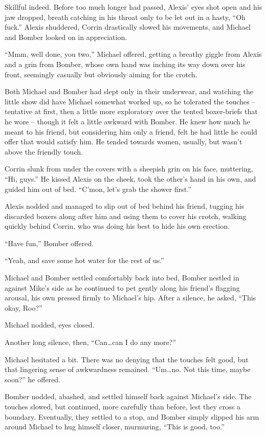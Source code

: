 Skillful indeed.  Before too much longer had passed, Alexis' eyes shot open and his jaw dropped, breath catching in his throat only to be let out in a hasty, ``Oh fuck.''  Alexis shuddered, Corrin drastically slowed his movements, and Michael and Bomber looked on in appreciation.

``Mmm, well done, you two,'' Michael offered, getting a breathy giggle from Alexis and a grin from Bomber, whose own hand was inching its way down over his front, seemingly casually but obviously aiming for the crotch.

Both Michael and Bomber had slept only in their underwear, and watching the little show did have Michael somewhat worked up, so he tolerated the touches -- tentative at first, then a little more exploratory over the tented boxer-briefs that he wore -- though it felt a little awkward with Bomber.  He knew how much he meant to his friend, but considering him only a friend, felt he had little he could offer that would satisfy him. He tended towards women, usually, but wasn't above the friendly touch.

Corrin slunk from under the covers with a sheepish grin on his face, muttering, ``Hi, guys.''  He kissed Alexis on the cheek, took the other's hand in his own, and guided him out of bed.  ``C'mon, let's grab the shower first.''

Alexis nodded and managed to slip out of bed behind his friend, tugging his discarded boxers along after him and using them to cover his crotch, walking quickly behind Corrin, who was doing his best to hide his own erection.

``Have fun,'' Bomber offered.

``Yeah, and save some hot water for the rest of us.''

Michael and Bomber settled comfortably back into bed, Bomber nestled in against Mike's side as he continued to pet gently along his friend's flagging arousal, his own pressed firmly to Michael's hip.  After a silence, he asked, ``This okay, Roo?''

Michael nodded, eyes closed.

Another long silence, then, ``Can\ldots{}can I do any more?''

Michael hesitated a bit.  There was no denying that the touches felt good, but that lingering sense of awkwardness remained.  ``Um\ldots{}no.  Not this time, maybe soon?'' he offered.

Bomber nodded, abashed, and settled himself back against Michael's side.  The touches slowed, but continued, more carefully than before, lest they cross a boundary.  Eventually, they settled to a stop, and Bomber simply slipped his arm around Michael to hug himself closer, murmuring, ``This is good, too.''

